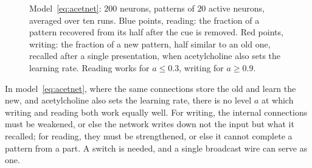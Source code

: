 \begin{figure}[t]
\centering
{}
\caption{Model~\eqref{eq:acetnet}: $200$ neurons, patterns of $20$ active neurons, averaged over ten runs. Blue points, reading: the fraction of a pattern recovered from its half after the cue is removed. Red points, writing: the fraction of a new pattern, half similar to an old one, recalled after a single presentation, when acetylcholine also sets the learning rate. Reading works for $a\le0.3$, writing for $a\ge0.9$.}
\label{fig:acetsim}
\end{figure}

\begin{keyblock}
\begin{proposition}
\label{prop:writeread}
In model~\eqref{eq:acetnet}, where the same connections store the old and learn the new, and acetylcholine also sets the learning rate, there is no level $a$ at which writing and reading both work equally well. For writing, the internal connections must be weakened, or else the network writes down not the input but what it recalled; for reading, they must be strengthened, or else it cannot complete a pattern from a part. A switch is needed, and a single broadcast wire can serve as one.
\end{proposition}
\end{keyblock}

